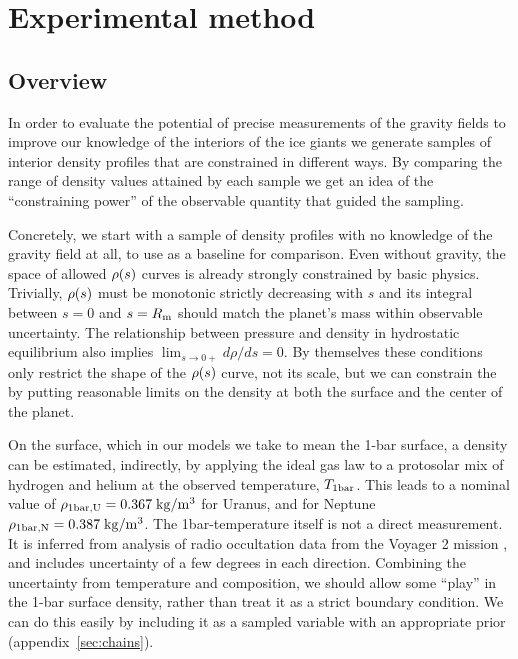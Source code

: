 
\section{Experimental method}\label{sec:method}

\subsection{Overview}\label{sec:overview}
In order to evaluate the potential of precise measurements of the gravity fields
to improve our knowledge of the interiors of the ice giants we generate samples
of interior density profiles that are constrained in different ways. By
comparing the range of density values attained by each sample we get an idea of
the ``constraining power'' of the observable quantity that guided the sampling.

Concretely, we start with a sample of density profiles with no knowledge of the
gravity field at all, to use as a baseline for comparison. Even without gravity,
the space of allowed $\rho(s)$ curves is already strongly constrained by basic
physics. Trivially, $\rho(s)$ must be monotonic strictly decreasing with $s$ and
its integral between $s=0$ and $s=R_{\text{m}}$ should match the planet's mass within
observable uncertainty. The relationship between pressure and density in
hydrostatic equilibrium also implies $\lim_{s\to{0+}}d\rho/ds=0$. By themselves
these conditions only restrict the shape of the $\rho(s)$ curve, not its scale,
but we can constrain the by putting reasonable limits on the density at both the
surface and the center of the planet.

On the surface, which in our models we take to mean the 1-bar surface, a density
can be estimated, indirectly, by applying the ideal gas law to a protosolar mix
of hydrogen and helium at the observed temperature, $T_{\text{1bar}}$. This leads to
a nominal value of $\rho_{\text{1bar,U}}=0.367\;\mathrm{kg/m^3}$ for Uranus, and for
Neptune $\rho_{\text{1bar,N}}=0.387\;\mathrm{kg/m^3}$. The 1bar-temperature itself is
not a direct measurement. It is inferred from analysis of radio occultation data
from the Voyager 2 mission \citep{Lindal1992}, and includes uncertainty of a few
degrees in each direction.  Combining the
uncertainty from temperature and composition, we should allow some ``play'' in
the 1-bar surface density, rather than treat it as a strict boundary condition.
We can do this easily by including it as a sampled variable with an appropriate
prior (appendix~\ref{sec:chains}).

